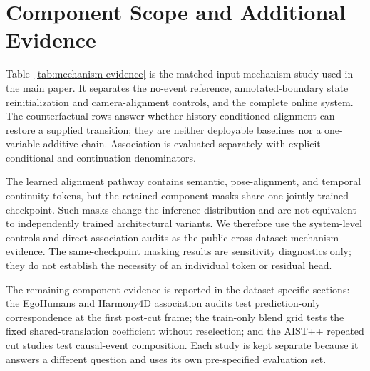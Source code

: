 \section{Component Scope and Additional Evidence}
\label{app:components}

Table~\ref{tab:mechanism-evidence} is the matched-input mechanism study used in the
main paper. It separates the no-event reference, annotated-boundary state
reinitialization and camera-alignment controls, and the complete online system. The
counterfactual rows answer whether history-conditioned alignment can restore a supplied
transition; they are neither deployable baselines nor a one-variable additive
chain. Association is evaluated separately with explicit conditional and
continuation denominators.

The learned alignment pathway contains semantic, pose-alignment, and temporal
continuity tokens, but the retained component masks share one jointly trained
checkpoint. Such masks change the inference distribution and are not
equivalent to independently trained architectural variants. We therefore use
the system-level controls and direct association audits as the public
cross-dataset mechanism evidence. The same-checkpoint masking results are
sensitivity diagnostics only; they do not establish the necessity of an
individual token or residual head.

The remaining component evidence is reported in the dataset-specific sections:
the EgoHumans and Harmony4D association audits test prediction-only
correspondence at the first post-cut frame; the train-only blend grid tests the fixed
shared-translation coefficient without reselection; and the AIST++ repeated
cut studies test causal-event composition. Each study is kept separate because
it answers a different question and uses its own pre-specified evaluation set.
